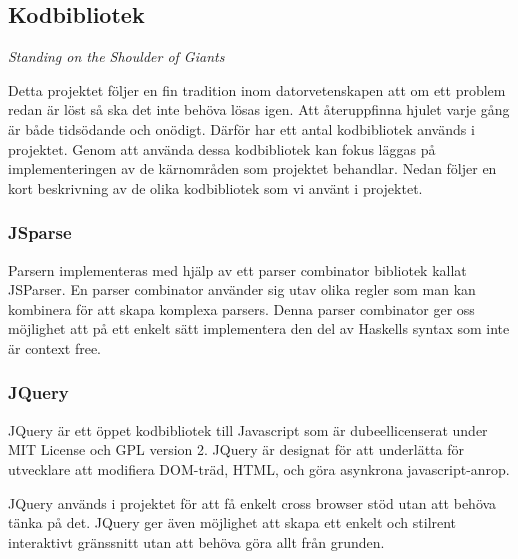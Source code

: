 \subsection{Kodbibliotek}

\emph{Standing on the Shoulder of Giants}

Detta projektet följer en fin tradition inom datorvetenskapen att om ett problem redan är löst så ska det inte behöva lösas igen. Att återuppfinna hjulet varje gång är både tidsödande och onödigt. 
Därför har ett antal kodbibliotek används i projektet. 
Genom att använda dessa kodbibliotek kan fokus läggas på implementeringen av de kärnområden som projektet behandlar.
Nedan följer en kort beskrivning av de olika kodbibliotek som vi använt i projektet.

 \subsubsection{JSparse}  
Parsern implementeras med hjälp av ett parser combinator bibliotek kallat JSParser.
En parser combinator använder sig utav olika regler som man kan kombinera för att skapa komplexa parsers. 
Denna parser combinator ger oss möjlighet att på ett enkelt sätt
implementera den del av  Haskells syntax som inte är context free.

\subsubsection{JQuery} 

JQuery är ett öppet kodbibliotek till Javascript som är dubeellicenserat under MIT License och GPL version 2.  
JQuery är designat för att underlätta för utvecklare att modifiera DOM-träd, HTML, och göra asynkrona javascript-anrop.

JQuery används i projektet för att få enkelt cross browser stöd utan att behöva tänka på det. 
JQuery ger även möjlighet att skapa ett enkelt och stilrent interaktivt gränssnitt utan att behöva göra allt från grunden.








